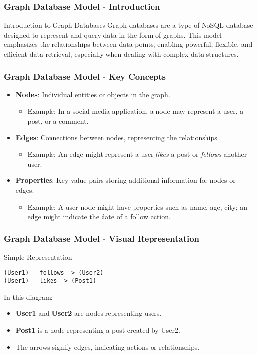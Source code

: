 \documentclass[aspectratio=169]{beamer}
\begin{document}
\begin{frame}[fragile]
    \frametitle{Graph Database Model - Introduction}
    \begin{block}{Introduction to Graph Databases}
        Graph databases are a type of NoSQL database designed to represent and query data in the form of graphs. 
        This model emphasizes the relationships between data points, enabling powerful, flexible, and efficient data retrieval, especially when dealing with complex data structures.
    \end{block}
\end{frame}

\begin{frame}[fragile]
    \frametitle{Graph Database Model - Key Concepts}
    \begin{itemize}
        \item \textbf{Nodes}: Individual entities or objects in the graph.
            \begin{itemize}
                \item Example: In a social media application, a node may represent a user, a post, or a comment.
            \end{itemize}
        \item \textbf{Edges}: Connections between nodes, representing the relationships.
            \begin{itemize}
                \item Example: An edge might represent a user \textit{likes} a post or \textit{follows} another user.
            \end{itemize}
        \item \textbf{Properties}: Key-value pairs storing additional information for nodes or edges.
            \begin{itemize}
                \item Example: A user node might have properties such as name, age, city; an edge might indicate the date of a follow action.
            \end{itemize}
    \end{itemize}
\end{frame}

\begin{frame}[fragile]
    \frametitle{Graph Database Model - Visual Representation}
    \begin{block}{Simple Representation}
        \begin{lstlisting}
(User1) --follows--> (User2)
(User1) --likes--> (Post1)
        \end{lstlisting}
    \end{block}
    
    In this diagram:
    \begin{itemize}
        \item \textbf{User1} and \textbf{User2} are nodes representing users.
        \item \textbf{Post1} is a node representing a post created by User2.
        \item The arrows signify edges, indicating actions or relationships.
    \end{itemize}
\end{frame}
\end{document}
